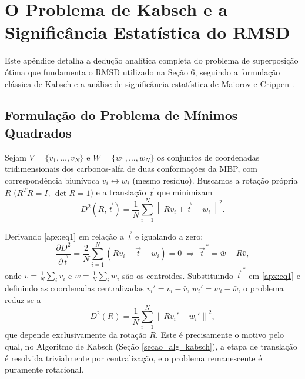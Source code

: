 \documentclass[12pt, a4paper]{article}
\theoremstyle{plain}
\theoremstyle{definition}
\theoremstyle{remark}
\newcommand{\ident}{\hspace{2em}}
\begin{document}
\section{O Problema de Kabsch e a Significância Estatística do RMSD}
\label{apx:rmsd}

\ident Este apêndice detalha a dedução analítica completa do problema de
superposição ótima que fundamenta o RMSD utilizado na Seção 6, seguindo a
formulação clássica de Kabsch e a análise de significância estatística de
Maiorov e Crippen \cite{maiorov1994}.

\subsection{Formulação do Problema de Mínimos Quadrados}

\ident Sejam $V=\{v_1,\dots,v_N\}$ e $W=\{w_1,\dots,w_N\}$ os conjuntos de
coordenadas tridimensionais dos carbonos-alfa de duas conformações da MBP,
com correspondência biunívoca $v_i \leftrightarrow w_i$ (mesmo resíduo).
Buscamos a rotação própria $R$ ($R^TR=I$, $\det R = 1$) e a translação
$\vec t$ que minimizam
\begin{equation}
    D^2(R,\vec t) = \frac{1}{N}\sum_{i=1}^N \left\| Rv_i + \vec t - w_i \right\|^2.
    \label{apx:eq1}
\end{equation}

\ident Derivando \eqref{apx:eq1} em relação a $\vec t$ e igualando a zero:
\begin{equation*}
    \frac{\partial D^2}{\partial \vec t} =
    \frac{2}{N}\sum_{i=1}^N \left( Rv_i + \vec t - w_i \right) = 0
    \;\Longrightarrow\;
    \vec t^{\,*} = \bar w - R\bar v,
\end{equation*}
onde $\bar v = \frac{1}{N}\sum_i v_i$ e $\bar w = \frac{1}{N}\sum_i w_i$ são os
centroides. Substituindo $\vec t^{\,*}$ em \eqref{apx:eq1} e definindo as
coordenadas centralizadas $v_i' = v_i - \bar v$, $w_i' = w_i - \bar w$, o
problema reduz-se a
\begin{equation*}
    D^2(R) = \frac{1}{N}\sum_{i=1}^N \left\| Rv_i' - w_i' \right\|^2,
\end{equation*}
que depende exclusivamente da rotação $R$. Este é precisamente o motivo pelo
qual, no Algoritmo de Kabsch (Seção \ref{secao_alg_kabsch}), a etapa de translação é resolvida
trivialmente por centralização, e o problema remanescente é puramente
rotacional.
\end{document}
